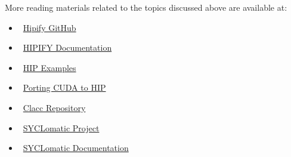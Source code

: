 \par
More reading materials related to the topics discussed above are available at:
\begin{itemize}
    \item~\href{https://github.com/ROCm-Developer-Tools/HIPIFY}{Hipify GitHub}
    \item~\href{https://rocm.docs.amd.com/projects/HIPIFY/en/latest/index.html}{HIPIFY Documentation}
    \item~\href{https://github.com/olcf-tutorials/simple_HIP_examples/tree/master/vector_addition}{HIP Examples}
    \item~\href{https://www.admin-magazine.com/HPC/Articles/Porting-CUDA-to-HIP}{Porting CUDA to HIP}
    \item~\href{https://github.com/llvm-doe-org/llvm-project/blob/clacc/main/README.md}{Clacc Repository}
    \item~\href{https://www.intel.com/content/www/us/en/developer/articles/technical/syclomatic-new-cuda-to-sycl-code-migration-tool.html}{SYCLomatic Project}
    \item~\href{https://oneapi-src.github.io/SYCLomatic/get_started/index.html}{SYCLomatic Documentation}
\end{itemize}
